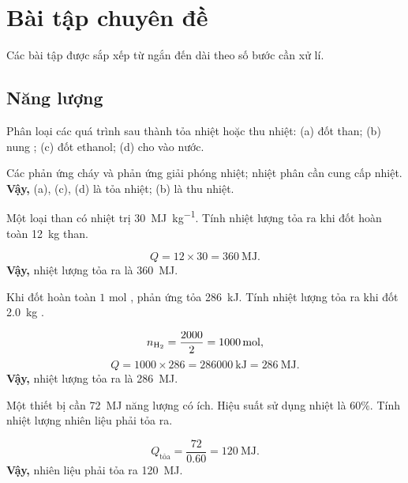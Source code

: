 \section{Bài tập chuyên đề}

Các bài tập được sắp xếp từ ngắn đến dài theo số bước cần xử lí.

\subsection{Năng lượng}

\begin{tuluyen}
Phân loại các quá trình sau thành tỏa nhiệt hoặc thu nhiệt: (a) đốt than; (b) nung ; (c) đốt ethanol; (d) cho  vào nước.
\begin{loigiaiBT}
Các phản ứng cháy và phản ứng  giải phóng nhiệt; nhiệt phân  cần cung cấp nhiệt.
\textbf{Vậy,} (a), (c), (d) là tỏa nhiệt; (b) là thu nhiệt.
\end{loigiaiBT}
\end{tuluyen}

\begin{tuluyen}
Một loại than có nhiệt trị \SI{30}{\mega\joule\per\kilo\gram}. Tính nhiệt lượng tỏa ra khi đốt hoàn toàn \SI{12}{\kilo\gram} than.
\begin{loigiaiBT}
\[
Q=12\times30=\SI{360}{\mega\joule}.
\]
\textbf{Vậy,} nhiệt lượng tỏa ra là \SI{360}{\mega\joule}.
\end{loigiaiBT}
\end{tuluyen}

\begin{tuluyen}
Khi đốt hoàn toàn $1$ mol , phản ứng tỏa \SI{286}{\kilo\joule}. Tính nhiệt lượng tỏa ra khi đốt \SI{2.0}{\kilo\gram} .
\begin{loigiaiBT}
\[
n_{\ce{H2}}=\frac{2000}{2}=\SI{1000}{\mole},
\]
\[
Q=1000\times286=\SI{286000}{\kilo\joule}=\SI{286}{\mega\joule}.
\]
\textbf{Vậy,} nhiệt lượng tỏa ra là \SI{286}{\mega\joule}.
\end{loigiaiBT}
\end{tuluyen}

\begin{tuluyen}
Một thiết bị cần \SI{72}{\mega\joule} năng lượng có ích. Hiệu suất sử dụng nhiệt là $60\%$. Tính nhiệt lượng nhiên liệu phải tỏa ra.
\begin{loigiaiBT}
\[
Q_{\text{tỏa}}=\frac{72}{0.60}=\SI{120}{\mega\joule}.
\]
\textbf{Vậy,} nhiên liệu phải tỏa ra \SI{120}{\mega\joule}.
\end{loigiaiBT}
\end{tuluyen}

